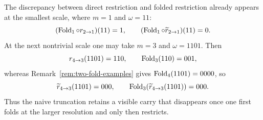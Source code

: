 \begin{remark}
\label{rem:restriction-examples}
The discrepancy between direct restriction and folded restriction already
appears at the smallest scale, where $m=1$ and $\omega=11$:
\[
(\operatorname{Fold}_1\circ r_{2\to 1})(11)=1,
\qquad
(\operatorname{Fold}_1\circ \widetilde r_{2\to 1})(11)=0.
\]
At the next nontrivial scale one may take $m=3$ and $\omega=1101$.  Then
\[
r_{4\to 3}(1101)=110,
\qquad
\operatorname{Fold}_3(110)=001,
\]
whereas Remark~\ref{rem:two-fold-examples} gives $\operatorname{Fold}_4(1101)=0000$, so
\[
\widetilde r_{4\to 3}(1101)=000,
\qquad
\operatorname{Fold}_3(\widetilde r_{4\to 3}(1101))=000.
\]
Thus the naive truncation retains a visible carry that disappears once one
first folds at the larger resolution and only then restricts.
\end{remark}

